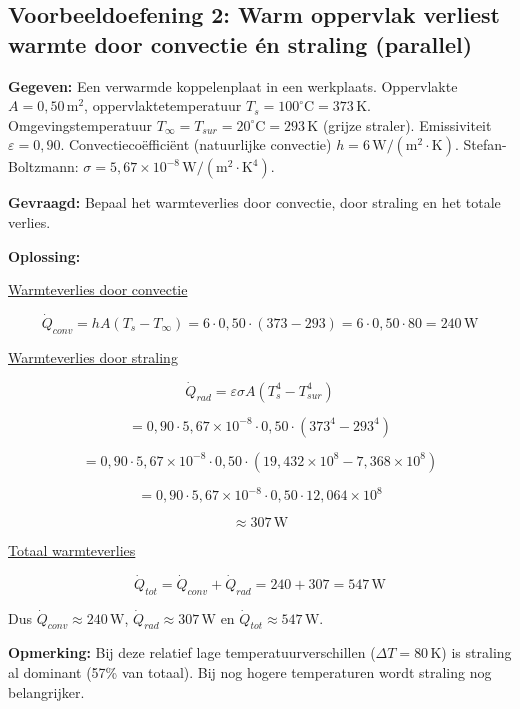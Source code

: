 \documentclass[a4paper,11pt,twoside]{report}
\begin{document}
\subsection*{Voorbeeldoefening 2: Warm oppervlak verliest warmte door convectie én straling (parallel)}

\textbf{Gegeven:} 
Een verwarmde koppelenplaat in een werkplaats. Oppervlakte $A=0{,}50\,\mathrm{m^2}$, oppervlaktetemperatuur $T_s=100^\circ\mathrm{C}=373\,\mathrm{K}$. 
Omgevingstemperatuur $T_\infty = T_{sur} = 20^\circ\mathrm{C}=293\,\mathrm{K}$ (grijze straler).
Emissiviteit $\varepsilon=0{,}90$.
Convectiecoëfficiënt (natuurlijke convectie) $h=6\,\mathrm{W/(m^2\cdot K)}$.
Stefan-Boltzmann: $\sigma=5{,}67 \times 10^{-8}\,\mathrm{W/(m^2 \cdot K^4)}$.

\textbf{Gevraagd:} 
Bepaal het warmteverlies door convectie, door straling en het totale verlies.

\textbf{Oplossing:}

\underline{Warmteverlies door convectie}

\[
\dot{Q}_{conv} = h A (T_s - T_\infty) = 6 \cdot 0{,}50 \cdot (373 - 293) = 6 \cdot 0{,}50 \cdot 80 = 240\,\mathrm{W}
\]

\underline{Warmteverlies door straling}

\[
\dot{Q}_{rad} = \varepsilon \sigma A (T_s^4 - T_{sur}^4)
\]

\[
= 0{,}90 \cdot 5{,}67 \times 10^{-8} \cdot 0{,}50 \cdot (373^4 - 293^4)
\]

\[
= 0{,}90 \cdot 5{,}67 \times 10^{-8} \cdot 0{,}50 \cdot (19{,}432 \times 10^8 - 7{,}368 \times 10^8)
\]

\[
= 0{,}90 \cdot 5{,}67 \times 10^{-8} \cdot 0{,}50 \cdot 12{,}064 \times 10^8
\]

\[
\approx 307\,\mathrm{W}
\]

\underline{Totaal warmteverlies}

\[
\dot{Q}_{tot} = \dot{Q}_{conv} + \dot{Q}_{rad} = 240 + 307 = 547\,\mathrm{W}
\]

Dus $\boxed{\dot{Q}_{conv} \approx 240\,\mathrm{W}}$, $\boxed{\dot{Q}_{rad} \approx 307\,\mathrm{W}}$ en $\boxed{\dot{Q}_{tot} \approx 547\,\mathrm{W}}$.

\textbf{Opmerking:} Bij deze relatief lage temperatuurverschillen ($\Delta T = 80\,\mathrm{K}$) is straling al dominant (57\% van totaal). Bij nog hogere temperaturen wordt straling nog belangrijker.
\end{document}
